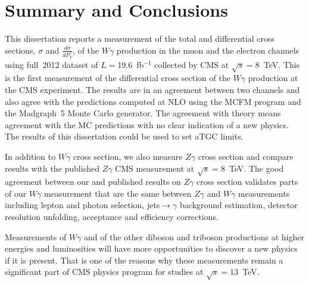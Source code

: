 \chapter{Summary and Conclusions}
\label{sec:Conclusions}

This dissertation reports a measurement of the total and differential cross sections, $\sigma$ and $\frac{d\sigma}{dP_T^{\gamma}}$, of the $W\gamma$ production in the muon and the electron channels using full~2012 dataset of $L=$19.6~fb$^{-1}$ collected by CMS at $\sqrt{s}=$8~TeV. This is the first measurement of the differential cross section of the $W\gamma$ production at the CMS experiment. The results are in an agreement between two channels and also agree with the predictions computed at NLO using the MCFM program and the Madgraph~5 Monte Carlo generator. The agreement with theory means agreement with the MC predictions with no clear indication of a new physics. The results of this dissertation could be used to set aTGC limits.

In addition to $W\gamma$ cross section, we also measure $Z\gamma$ cross section and compare results with the published $Z\gamma$ CMS measurement at $\sqrt{s}=$8~TeV. The good agreement between our and published results on $Z\gamma$ cross section validates parts of our $W\gamma$ measurement that are the same between $Z\gamma$ and $W\gamma$ measurements including lepton and photon selection, jets$\rightarrow\gamma$ background estimation, detector resolution unfolding, acceptance and efficiency corrections.

Measurements of $W\gamma$ and of the other diboson and triboson productions at higher energies and luminosities will have more opportunities to discover a new physics if it is present. That is one of the reasons why these measurements remain a significant part of CMS physics program for studies at $\sqrt{s}=$13~TeV.

